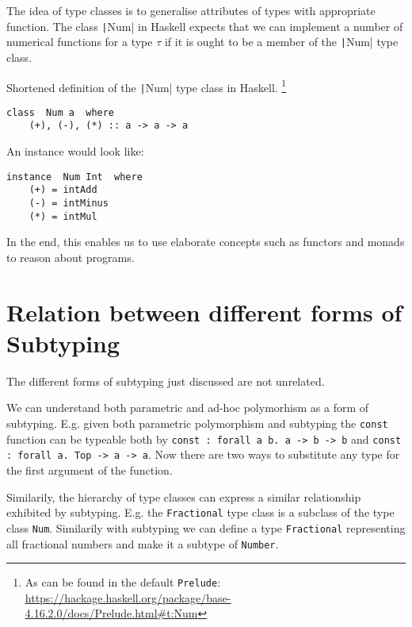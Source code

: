 The idea of type classes is to generalise attributes of types with appropriate function.
The class \texttt|Num| in Haskell expects that we can implement a number of numerical functions for a type $\tau$ if it is ought to be a member of the \texttt|Num| type class.

Shortened definition of the \texttt|Num| type class in Haskell.
\footnote{As can be found in the default \texttt{Prelude}: \url{https://hackage.haskell.org/package/base-4.16.2.0/docs/Prelude.html\#t:Num}}

\begin{verbatim}
class  Num a  where
    (+), (-), (*) :: a -> a -> a
\end{verbatim}

An instance would look like:

\begin{verbatim}
instance  Num Int  where
    (+) = intAdd
    (-) = intMinus
    (*) = intMul
\end{verbatim}



In the end, this enables us to use elaborate concepts such as functors and monads to reason about programs.

\cite{wadlerblott}

\section{Relation between different forms of Subtyping}\label{sec:relations}

The different forms of subtyping just discussed are not unrelated.

We can understand both parametric and ad-hoc polymorhism as a form of subtyping.
E.g. given both parametric polymorphism and subtyping the \texttt{const} function can be typeable both by
\texttt{const : forall a b. a -> b -> b} and \texttt{const : forall a. Top -> a -> a}.
Now there are two ways to substitute any type for the first argument of the function.

Similarily, the hierarchy of type classes can express a similar relationship exhibited by subtyping.
E.g. the \texttt{Fractional} type class is a subclass of the type class \texttt{Num}.
Similarily with subtyping we can define a type \texttt{Fractional} representing all fractional numbers and make it a subtype of \texttt{Number}.


